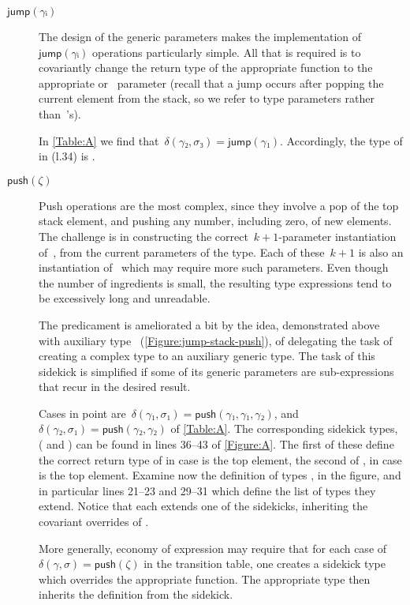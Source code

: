 \begin{description}
  \item[$\textsf{jump}(γᵢ)$]
  The design of the generic parameters makes the implementation of~$\textsf{jump}(γᵢ)$
    operations particularly simple.
  All that is required is to covariantly change the return type of the
    appropriate  function to the appropriate  or~ parameter
    (recall that a jump occurs after popping the current element from the stack, so %
    we refer to  type parameters rather than~'s).
  \par
  In \cref{Table:A} we find that~$δ(γ₂,σ₃) =\textsf{jump}(γ₁)$. 
  Accordingly, the type of  in  (l.34) is .

  \item[$\textsf{push}(ζ)$]
  Push operations are the most complex, since they involve a pop of the top stack element,
    and pushing any number, including zero, of new elements.
  The challenge is in constructing the correct~$k+1$-parameter instantiation of~,
    from the current parameters of the type.
  Each of these~$k+1$ is also an instantiation of~ which may require more such
    parameters.
  Even though the number of ingredients is small, the resulting type expressions
    tend to be excessively long and unreadable.
  \par
  The predicament is ameliorated a bit by the idea,
    demonstrated above with auxiliary type~
    (\cref{Figure:jump-stack-push}),
    of delegating the task of creating a complex type to an auxiliary
    generic type.
  The task of this sidekick is simplified if some of its generic
  parameters are sub-expressions that recur in the desired
  result.
  \par
  Cases in point
    are~$δ(γ₁,σ₁)=\textsf{push}(γ₁,γ₁,γ₂)$, and~$δ(γ₂,σ₁)=\textsf{push}(γ₂,γ₂)$ of \cref{Table:A}.
  The corresponding sidekick types,
    ( and )
    can be found in lines 36--43 of \cref{Figure:A}.
  The first of these define the correct return type
    of  in case  is the top element,
    the second of , in case  is the top element.
  Examine now the definition of types , in the figure,
    and in particular lines 21--23 and 29--31 which define the list of types they extend.
  Notice that each extends one of the sidekicks, inheriting the covariant
    overrides of .
  \par
  More generally, economy of expression may require that for each case
    of~$δ(γ,σ)=\textsf{push}(ζ)$ in the transition table,
    one creates a sidekick type which overrides the appropriate 
    function.
  The appropriate  type then inherits the definition
    from the sidekick.
\end{description}

